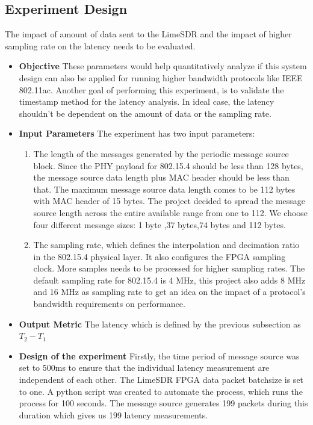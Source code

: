 \subsection{Experiment Design}
The impact of amount of data sent to the LimeSDR and the impact of higher sampling rate on the latency needs to be evaluated.
\begin{itemize}
    \item {\textbf{Objective} These parameters would help quantitatively analyze if this system design can also be applied for running higher bandwidth protocols like IEEE 802.11ac.
Another goal of performing this experiment, is to validate the timestamp method for the latency analysis.
In ideal case, the latency shouldn't be dependent on the amount of data or the sampling rate.}
\item{\textbf{Input Parameters} The experiment has two input parameters:
\begin{enumerate}
    \item {The length of the messages generated by the periodic message source block.
    Since the PHY payload for 802.15.4 should be less than 128 bytes, the message source data length plus MAC header should be less than that.
    The maximum message source data length comes to be 112 bytes with MAC header of 15 bytes.
    The project decided to spread the message source length across the entire available range from one to 112.
    We choose four different message sizes: 1 byte ,37 bytes,74 bytes and 112 bytes.}
    \item {The sampling rate, which defines the interpolation and decimation ratio in the 802.15.4 physical layer.
    It also configures the FPGA sampling clock.
    More samples needs to be processed for higher sampling rates.
    The default sampling rate for 802.15.4 is 4 MHz, this project also adds 8 MHz and 16 MHz as sampling rate to get an idea on the impact of a protocol's bandwidth requirements on performance.
    }
\end{enumerate}
}
\item{\textbf{Output Metric} The latency which is defined by the previous subsection as $T_2 - T_1$}
\item{\textbf{Design of the experiment} Firstly, the time period of message source was set to 500ms to ensure that the individual latency measurement are independent of each other.
The LimeSDR FPGA data packet batchsize is set to one.
A python script was created to automate the process, which runs the process for 100 seconds.
The message source generates 199 packets during this duration which gives us 199 latency measurements.
}
\end{itemize}

